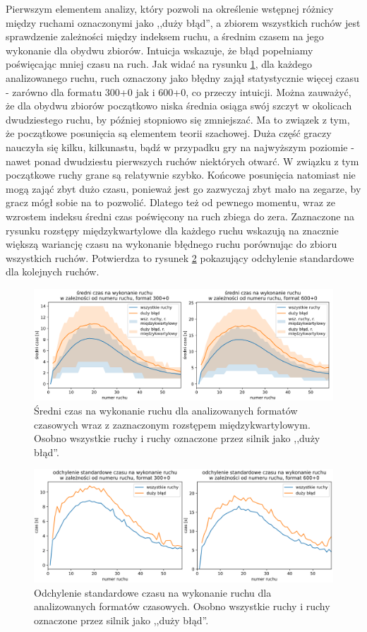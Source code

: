 \documentclass[inzynierska]{pwr_wmat_praca_dyplomowa}
\theoremstyle{plain}
\numberwithin{theorem}{chapter}
\theoremstyle{definition}
\numberwithin{theorem}{chapter}
\begin{document}
Pierwszym elementem analizy, który pozwoli na określenie wstępnej różnicy między ruchami oznaczonymi jako ,,duży błąd'', a zbiorem wszystkich ruchów jest sprawdzenie zależności między indeksem ruchu, a średnim czasem na jego wykonanie dla obydwu zbiorów. Intuicja wskazuje, że błąd popełniamy poświęcając mniej czasu na ruch. Jak widać na rysunku \ref{rys:sr_czas_na_ruch}, dla każdego analizowanego ruchu, ruch oznaczony jako błędny zajął statystycznie więcej czasu - zarówno dla formatu 300+0 jak i 600+0, co przeczy intuicji. Można zauważyć, że dla obydwu zbiorów początkowo niska średnia osiąga swój szczyt w okolicach dwudziestego ruchu, by później stopniowo się zmniejszać. Ma to związek z tym, że początkowe posunięcia są elementem teorii szachowej. Duża część graczy nauczyła się kilku, kilkunastu, bądź w przypadku gry na najwyższym poziomie - nawet ponad dwudziestu pierwszych ruchów niektórych otwarć. W związku z tym początkowe ruchy grane są relatywnie szybko. Końcowe posunięcia natomiast nie mogą zająć zbyt dużo czasu, ponieważ jest go zazwyczaj zbyt mało na zegarze, by gracz mógł sobie na to pozwolić. Dlatego też od pewnego momentu, wraz ze wzrostem indeksu średni czas poświęcony na ruch zbiega do zera. Zaznaczone na rysunku rozstępy międzykwartylowe dla każdego ruchu wskazują na znacznie większą wariancję czasu na wykonanie błędnego ruchu porównując do zbioru wszystkich ruchów. Potwierdza to rysunek \ref{rys:std_czas_na_ruch} pokazujący odchylenie standardowe dla kolejnych ruchów. 
\begin{figure}[H]
	\centering
	\includegraphics[width=\textwidth]{sr_czas_na_ruch.png}
	\caption{Średni czas na wykonanie ruchu dla analizowanych formatów czasowych wraz z zaznaczonym rozstępem międzykwartylowym. Osobno wszystkie ruchy i ruchy oznaczone przez silnik jako ,,duży błąd''.}
	\label{rys:sr_czas_na_ruch}
\end{figure}
\begin{figure}[H]
	\centering
	\includegraphics[width=\textwidth]{std_czas_na_ruch.png}
	\caption{Odchylenie standardowe czasu na wykonanie ruchu dla analizowanych formatów czasowych. Osobno wszystkie ruchy i ruchy oznaczone przez silnik jako ,,duży błąd''.}
	\label{rys:std_czas_na_ruch}
\end{figure}
\end{document}
